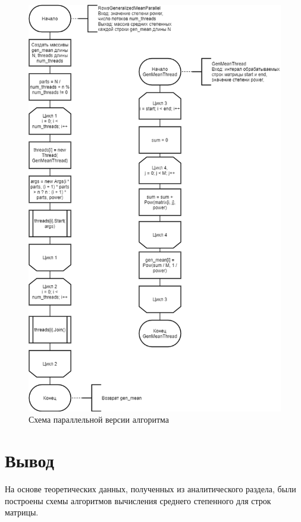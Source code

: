 \documentclass[12pt]{report}
\begin{document}
\begin{figure}[H]
	\centering
	\includegraphics[scale = 0.52]{parallel_scheme.png}
	\caption{Схема параллельной версии алгоритма}
	\label{prl}
\end{figure}

\section{Вывод}
На основе теоретических данных, полученных из аналитического раздела, были построены схемы алгоритмов вычисления среднего степенного для строк матрицы.

\newpage
\end{document}
